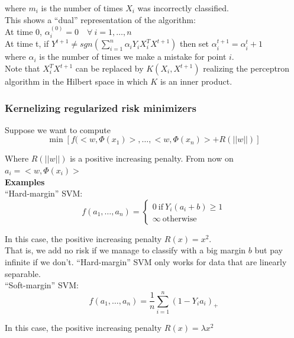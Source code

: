 \documentclass[11pt, english]{article}
\begin{document}
where $m_i$ is the number of times $X_i$ was incorrectly classified.\\

This shows a ``dual'' representation of the algorithm:\\

At time 0, $\alpha_i^{(0)} = 0 \quad \forall \ i = 1, \dots, n$\\
At time t, if $Y^{t+1} \neq sgn(\sum_{i=1}^{n} \alpha_i Y_i X_i^TX^{t+1}) $ then set $\alpha_i^{t+1} = \alpha_i^t + 1$\\

where $\alpha_i$ is the number of times we make a mistake for point $i$.\\ 

Note that $X_i^TX^{t+1}$ can be replaced by $K(X_i, X^{t+1})$ realizing the perceptron algorithm in the Hilbert space in which $K$ is an inner product.


\subsubsection{Kernelizing regularized risk minimizers}

Suppose we want to compute
\begin{equation}
	\min[f(<w,\Phi(x_1)>, \dots, <w, \Phi (x_n)>+ R(||w||)]
\end{equation}

Where $ R(||w||)$ is a positive increasing penalty. From now on $a_i = <w,\Phi(x_i)>$\\

\textbf{Examples} \\
``Hard-margin'' SVM:
$$f(a_1, \dots, a_n) = \begin{cases}
0\ \text{if}\ Y_i(a_i + b)\geq 1\\
\infty \ \text{otherwise}
\end{cases}$$

In this case, the positive increasing penalty $R(x) = x^2$.\\

That is, we add no risk if we manage to classify with a big margin $b$ but pay infinite if we don't. ``Hard-margin'' SVM only works for data that are linearly separable.\\

``Soft-margin'' SVM:
$$
f(a_1,\dots,a_n) = \frac{1}{n} \sum_{i=1}^{n}(1 - Y_ia_i)_+
$$

In this case, the positive increasing penalty $R(x) = \lambda x^2$\\
\end{document}
